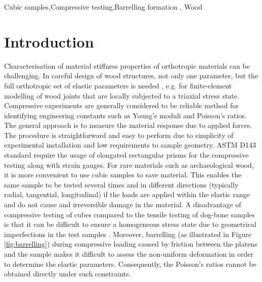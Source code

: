 \documentclass[3p]{elsarticle}
\begin{document}
\begin{frontmatter}
\begin{abstract}
\end{abstract}

\begin{keyword}
Cubic samples\sep Compressive testing\sep Barrelling formation \sep
Wood
\end{keyword}

\end{frontmatter}

\linenumbers

\section{Introduction}

Characterisation of material stiffness properties of orthotropic materials can
be challenging. In  careful design of wood structures, not only one parameter,
but the full orthotropic set of elastic parameters is needed \cite{tsoumis1991science},
e.g. for finite-element modelling of wood joints that are locally subjected to a
triaxial stress state. Compressive experiments are generally considered to be
reliable method for identifying engineering constants such as Young's moduli and Poisson's ratios. The general approach is to measure the material response due to applied
forces. The procedure is straightforward and easy to perform due to simplicity of experimental installation and low requirements to sample
geometry. ASTM D143 standard \cite{standard1997d143,
johnson1983compression} require the usage of elongated rectangular prisms for
the compressive testing along with strain gauges.
For rare materials such as archaeological wood, it is more convenient to use
cubic samples \cite{ljungdahl2007transverse, vorobyevcharacterisation} to save
material.
This enables the same sample to be tested several times and in
different directions (typically radial, tangential, longitudinal) if the loads are
applied within the elastic range and do not cause and irreversible damage in the material.
A disadvantage of compressive testing of cubes compared to the tensile testing
of dog-bone samples is that it can be difficult to ensure a homogeneous stress
state due to geometrical imperfections in the test samples
\cite{Toftegaard1999849}.
Moreover, barrelling  (as illustrated in Figure \ref{fig:barrelling}) during
compressive loading \cite{oldroyd1966stress} caused by friction between the platens and the
sample makes it difficult to assess the non-uniform deformation in order to
determine the elastic parameters.
Consequently, the Poisson's ratios cannot be obtained directly under such constraints. 
\end{document}
